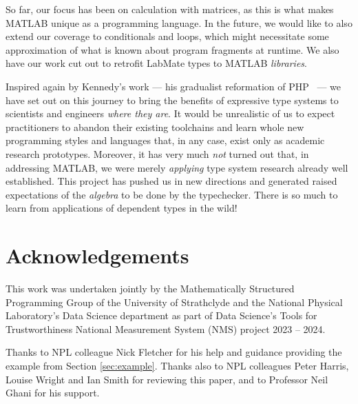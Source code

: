 \documentclass{IMEKO2024}
\newcommand{\remph}{\emph}
\begin{document}
So far, our focus has been on calculation with matrices, as this is what makes MATLAB
unique as a programming language.
%
In the future, we would like to also extend our coverage to
conditionals and loops, which might necessitate some approximation of
what is known about program fragments at runtime.
%
We also have our work cut out to retrofit LabMate types to MATLAB \remph{libraries}.

Inspired again by Kennedy's work --- his gradualist reformation of PHP~\cite{hack} ---
we have set out on this journey to bring the benefits of expressive type systems to scientists and engineers \remph{where they are}.
%
It would be unrealistic of us to expect practitioners to abandon their existing toolchains and learn whole new programming styles and languages that, in any case, exist only as academic research prototypes.
%
Moreover, it has very much \remph{not} turned out that, in addressing MATLAB, we were merely \remph{applying} type system research already well established.
%
This project has pushed us in new directions and generated raised expectations of the \remph{algebra} to be done by the typechecker.
%
There is so much to learn from applications of dependent types in the wild!

\section{Acknowledgements}

This work was undertaken jointly by the Mathematically Structured Programming Group of the University of Strathclyde and the National Physical Laboratory’s Data Science department as part of Data Science’s Tools for Trustworthiness National Measurement System (NMS) project 2023 – 2024.

Thanks to NPL colleague Nick Fletcher for his help and guidance providing the example from Section \ref{sec:example}. Thanks also to NPL colleagues Peter Harris, Louise Wright and Ian Smith for reviewing this paper, and to Professor Neil Ghani for his support.

%


\end{document}
